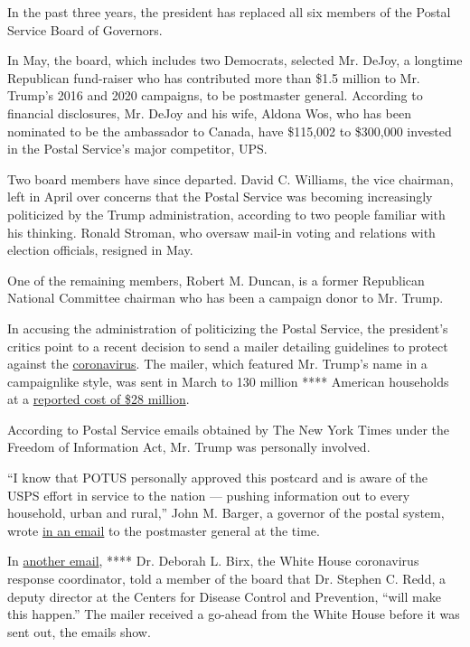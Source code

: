 In the past three years, the president has replaced all six members of
the Postal Service Board of Governors.

In May, the board, which includes two Democrats, selected Mr. DeJoy, a
longtime Republican fund-raiser who has contributed more than \$1.5
million to Mr. Trump's 2016 and 2020 campaigns, to be postmaster
general. According to financial disclosures, Mr. DeJoy and his wife,
Aldona Wos, who has been nominated to be the ambassador to Canada, have
\$115,002 to \$300,000 invested in the Postal Service's major
competitor, UPS.

Two board members have since departed. David C. Williams, the vice
chairman, left in April over concerns that the Postal Service was
becoming increasingly politicized by the Trump administration, according
to two people familiar with his thinking. Ronald Stroman, who oversaw
mail-in voting and relations with election officials, resigned in May.

One of the remaining members, Robert M. Duncan, is a former Republican
National Committee chairman who has been a campaign donor to Mr. Trump.

In accusing the administration of politicizing the Postal Service, the
president's critics point to a recent decision to send a mailer
detailing guidelines to protect against the
\href{https://www.nytimes3xbfgragh.onion/interactive/2020/us/coronavirus-us-cases.htmlhttps://www.nytimes3xbfgragh.onion/interactive/2020/us/coronavirus-us-cases.html}{coronavirus}.
The mailer, which featured Mr. Trump's name in a campaignlike style, was
sent in March to 130 million **** American households at a
\href{https://www.usatoday.com/story/news/politics/2020/05/28/coronavirus-post-card-trump-cost-post-office-28-million/5274034002/}{reported
cost of \$28 million}.

According to Postal Service emails obtained by The New York Times under
the Freedom of Information Act, Mr. Trump was personally involved.

``I know that POTUS personally approved this postcard and is aware of
the USPS effort in service to the nation --- pushing information out to
every household, urban and rural,'' John M. Barger, a governor of the
postal system, wrote
\href{https://www.documentcloud.org/documents/7010858-USPS-Email-Trump-Personally-Approved-28M.html}{in
an email} to the postmaster general at the time.

In
\href{https://www.documentcloud.org/documents/7010863-USPS-Emails-Show-Trump-Coronavirus-Postcard-Was.html}{another
email}, **** Dr. Deborah L. Birx, the White House coronavirus response
coordinator, told a member of the board that Dr. Stephen C. Redd, a
deputy director at the Centers for Disease Control and Prevention,
``will make this happen.'' The mailer received a go-ahead from the White
House before it was sent out, the emails show.

